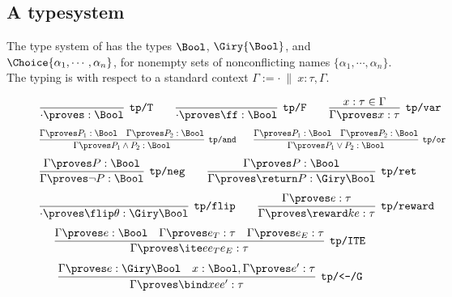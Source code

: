 \subsection{A \dappl{} typesystem}
\label{appendix:typesystem}
The type system of \dappl{} has the types
$\Bool$, $\Giry{\Bool}$, and $\Choice{\alpha_1, \cdots, \alpha_n}$,
for nonempty sets of nonconflicting names
$\{\alpha_1, \cdots, \alpha_n\}$.
The typing is with respect to
a standard context $\Gamma := \cdot \ \| \ x: \tau, \Gamma$.

\begin{figure}[H]
\begin{mdframed}
{\centering
  \begin{align*}
    \infer[\texttt{tp/T}]
      {\cdot \proves \tt : \Bool}
      {}
    \qquad
    \infer[\texttt{tp/F}]
      {\cdot \proves \ff : \Bool}
      {}
    \qquad
    \infer[\texttt{tp/var}]
      {\Gamma \proves x : \tau}
      {x : \tau  \in \Gamma}
  \end{align*}
  \begin{align*}
    \infer[\texttt{tp/and}]
      {\Gamma \proves P_1  \land P_2 : \Bool}
      {\Gamma \proves P_1  : \Bool
      &
      \Gamma \proves P_2  : \Bool}
    \qquad
    \infer[\texttt{tp/or}]
      {\Gamma \proves P_1  \lor P_2 : \Bool}
      {\Gamma \proves P_1  : \Bool
      &
      \Gamma \proves P_2  : \Bool}
  \end{align*}
  \begin{align*}
    \infer[\texttt{tp/neg}]
      {\Gamma \proves \neg P: \Bool}
      {\Gamma \proves P : \Bool}
    \qquad
    \infer[\texttt{tp/ret}]
      {\Gamma \proves \return P : \Giry \Bool}
      {\Gamma \proves P : \Bool}
  \end{align*}
    \begin{align*}
      \infer[\texttt{tp/flip}]
        {\cdot \proves \flip \theta : \Giry \Bool}
        {}
      \qquad
      \infer[\texttt{tp/reward}]
        {\Gamma \proves \reward k e: \tau}
        {\Gamma \proves e : \tau}
    \end{align*}
    \begin{align*}
      \infer[\texttt{tp/ITE}]
        {\Gamma \proves \ite e {e_T} {e_E} : \tau}
        {\Gamma \proves e : \Bool
        & \Gamma \proves e_T : \tau
        & \Gamma \proves e_E : \tau}
    \end{align*}
    \begin{align*}
      \infer[\texttt{tp/<-/G}]
        {\Gamma \proves \bind x e {e'} : \tau}
        {\Gamma \proves e : \Giry \Bool
        & x : \Bool, \Gamma \proves e' : \tau}

\end{align*}}
\end{mdframed}
\end{figure}
